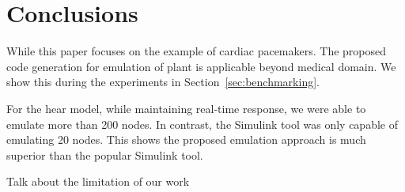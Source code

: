 \section{Conclusions}

While this paper focuses on the example of cardiac pacemakers.
The proposed code generation for emulation of plant is applicable 
beyond medical domain.
We show this during the experiments in Section~\ref{sec:benchmarking}.


For the hear model, while maintaining real-time response,
 we were able to emulate more than 200 nodes. In contrast,
 the Simulink tool was only capable of emulating 20 nodes. 
 This shows the proposed emulation approach is much superior than 
 the popular Simulink tool.


Talk about the limitation of our work

